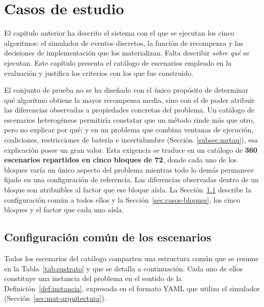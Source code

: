 \chapter{Casos de estudio}\label{cap:casos_estudio}

El capítulo anterior ha descrito el sistema con el que se ejecutan los cinco algoritmos: el simulador de eventos discretos, la función de recompensa y las decisiones de implementación que los materializan. Falta describir \emph{sobre qué} se ejecutan. Este capítulo presenta el catálogo de escenarios empleado en la evaluación y justifica los criterios con los que fue construido.

El conjunto de prueba no se ha diseñado con el único propósito de determinar qué algoritmo obtiene la mayor recompensa media, sino con el de poder atribuir las diferencias observadas a propiedades concretas del problema. Un catálogo de escenarios heterogéneos permitiría constatar que un método rinde más que otro, pero no explicar por qué; y en un problema que combina ventanas de ejecución, coaliciones, restricciones de batería e incertidumbre (Sección~\ref{subsec:mrtau}), esa explicación posee un gran valor. Esta exigencia se traduce en un catálogo de \textbf{360 escenarios repartidos en cinco bloques de 72}, donde cada uno de los bloques varía un único aspecto del problema mientras todo lo demás permanece fijado en una configuración de referencia. Las diferencias observadas dentro de un bloque son atribuibles al factor que ese bloque aísla. La Sección~\ref{sec:casos-comun} describe la configuración común a todos ellos y la Sección~\ref{sec:casos-bloques}, los cinco bloques y el factor que cada uno aísla.

\section{Configuración común de los escenarios} \label{sec:casos-comun}

Todos los escenarios del catálogo comparten una estructura común que se resume en la Tabla~\ref{tab:sustrato} y que se detalla a continuación. Cada uno de ellos constituye una instancia del problema en el sentido de la Definición~\ref{def:instancia}, expresada en el formato YAML que utiliza el simulador (Sección~\ref{sec:mat-arquitectura}).

